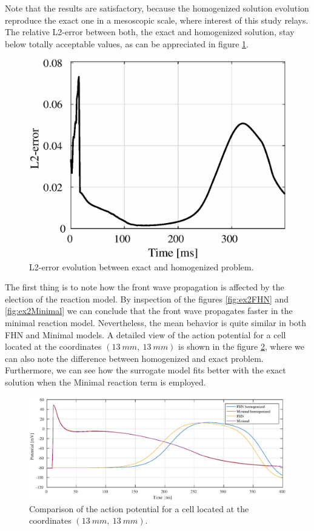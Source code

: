Note that the results are satisfactory, because the homogenized solution evolution reproduce the exact one in a mesoscopic scale, where interest of this study relays. The relative L2-error between both, the exact and homogenized solution, stay below totally acceptable values, as can be appreciated in figure \ref{fig:ex2_error}. 

\begin{figure}[!htbp]
	\centering
	\includegraphics[height = 5 cm]{fig/Numerical_Experiments/ex2/MINIMAL/error_L2}
	\caption{L2-error evolution between exact and homogenized problem.} \label{fig:ex2_error}
\end{figure}

The first thing is to note how the front wave propagation is affected by the election of the reaction model. By inspection of the figures \ref{fig:ex2FHN} and \ref{fig:ex2Minimal} we can conclude that the front wave propagates faster in the minimal reaction model. Nevertheless, the mean behavior is quite similar in both FHN and Minimal models. A detailed view of the action potential for a cell located at the coordinates $(13~mm,~13~mm)$ is shown in the figure \ref{fig:cell_comparison}, where we can also note the difference between homogenized and exact problem. Furthermore, we can see how the surrogate model fits better with the exact solution when the Minimal reaction term is employed.

\begin{figure}[!htbp]
	\centering
	\includegraphics[height = 6.5 cm, trim ={2cm, 0cm, 0cm, 0cm}, clip]{fig/Numerical_Experiments/ex2/cell_comparison}
	\caption{Comparison of the action potential for a cell located at the coordinates $(13~mm,~13~mm).$}
	\label{fig:cell_comparison}
\end{figure}

